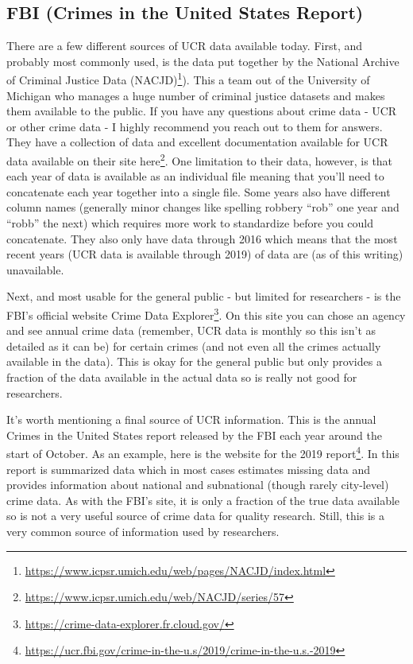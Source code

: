 \documentclass[
]{krantz}
\renewcommand{\href}[2]{#2\footnote{\url{#1}}}
\begin{document}
\subsection{FBI (Crimes in the United States
Report)}\label{fbi-crimes-in-the-united-states-report}

There are a few different sources of UCR data available
today. First, and probably most commonly used, is the data
put together by the
\href{https://www.icpsr.umich.edu/web/pages/NACJD/index.html}{National
Archive of Criminal Justice Data (NACJD)}). This a team out
of the University of Michigan who manages a huge number of
criminal justice datasets and makes them available to the
public. If you have any questions about crime data - UCR or
other crime data - I highly recommend you reach out to them
for answers. They have a collection of data and excellent
documentation available for UCR data available on their site
\href{https://www.icpsr.umich.edu/web/NACJD/series/57}{here}.
One limitation to their data, however, is that each year of
data is available as an individual file meaning that you'll
need to concatenate each year together into a single file.
Some years also have different column names (generally minor
changes like spelling robbery ``rob'' one year and ``robb''
the next) which requires more work to standardize before you
could concatenate. They also only have data through 2016
which means that the most recent years (UCR data is
available through 2019) of data are (as of this writing)
unavailable.

Next, and most usable for the general public - but limited
for researchers - is the FBI's official website
\href{https://crime-data-explorer.fr.cloud.gov/}{Crime Data
Explorer}. On this site you can chose an agency and see
annual crime data (remember, UCR data is monthly so this
isn't as detailed as it can be) for certain crimes (and not
even all the crimes actually available in the data). This is
okay for the general public but only provides a fraction of
the data available in the actual data so is really not good
for researchers.

It's worth mentioning a final source of UCR information.
This is the annual Crimes in the United States report
released by the FBI each year around the start of October.
As an example, here is the
\href{https://ucr.fbi.gov/crime-in-the-u.s/2019/crime-in-the-u.s.-2019}{website
for the 2019 report}. In this report is summarized data
which in most cases estimates missing data and provides
information about national and subnational (though rarely
city-level) crime data. As with the FBI's site, it is only a
fraction of the true data available so is not a very useful
source of crime data for quality research. Still, this is a
very common source of information used by researchers.
\end{document}
